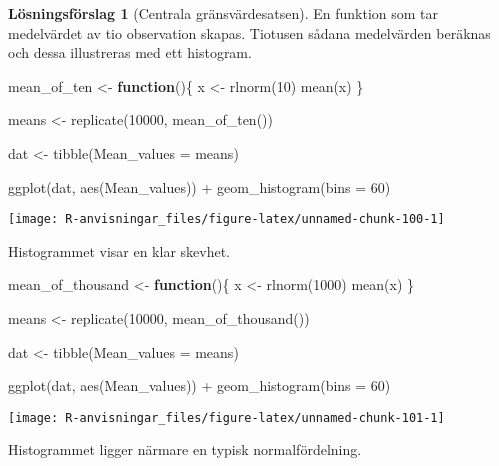 \documentclass[
]{book}
\newenvironment{Shaded}{\begin{snugshade}}{\end{snugshade}}
\newcommand{\AttributeTok}[1]{\textcolor[rgb]{0.77,0.63,0.00}{#1}}
\newcommand{\ControlFlowTok}[1]{\textcolor[rgb]{0.13,0.29,0.53}{\textbf{#1}}}
\newcommand{\DecValTok}[1]{\textcolor[rgb]{0.00,0.00,0.81}{#1}}
\newcommand{\FunctionTok}[1]{\textcolor[rgb]{0.00,0.00,0.00}{#1}}
\newcommand{\NormalTok}[1]{#1}
\newcommand{\OtherTok}[1]{\textcolor[rgb]{0.56,0.35,0.01}{#1}}
\newcommand{\SpecialCharTok}[1]{\textcolor[rgb]{0.00,0.00,0.00}{#1}}
\theoremstyle{definition}
\theoremstyle{definition}
\theoremstyle{definition}
\theoremstyle{definition}
\newtheorem{hypothesis}{Lösningsförslag}[chapter]
\theoremstyle{remark}
\begin{document}
\begin{hypothesis}[Centrala gränsvärdesatsen]
En funktion som tar medelvärdet av tio observation skapas. Tiotusen sådana medelvärden beräknas och dessa illustreras med ett histogram.

\begin{Shaded}
\begin{Highlighting}[]
\NormalTok{mean\_of\_ten }\OtherTok{\textless{}{-}} \ControlFlowTok{function}\NormalTok{()\{}
\NormalTok{  x }\OtherTok{\textless{}{-}} \FunctionTok{rlnorm}\NormalTok{(}\DecValTok{10}\NormalTok{)}
  \FunctionTok{mean}\NormalTok{(x)}
\NormalTok{\}}

\NormalTok{means }\OtherTok{\textless{}{-}} \FunctionTok{replicate}\NormalTok{(}\DecValTok{10000}\NormalTok{, }\FunctionTok{mean\_of\_ten}\NormalTok{())}

\NormalTok{dat }\OtherTok{\textless{}{-}} \FunctionTok{tibble}\NormalTok{(}\AttributeTok{Mean\_values =}\NormalTok{ means)}

\FunctionTok{ggplot}\NormalTok{(dat, }\FunctionTok{aes}\NormalTok{(Mean\_values)) }\SpecialCharTok{+}
  \FunctionTok{geom\_histogram}\NormalTok{(}\AttributeTok{bins =} \DecValTok{60}\NormalTok{)}
\end{Highlighting}
\end{Shaded}

\begin{center}\texttt{[image: R-anvisningar\_files/figure-latex/unnamed-chunk-100-1]} \end{center}

Histogrammet visar en klar skevhet.

\begin{Shaded}
\begin{Highlighting}[]
\NormalTok{mean\_of\_thousand }\OtherTok{\textless{}{-}} \ControlFlowTok{function}\NormalTok{()\{}
\NormalTok{  x }\OtherTok{\textless{}{-}} \FunctionTok{rlnorm}\NormalTok{(}\DecValTok{1000}\NormalTok{)}
  \FunctionTok{mean}\NormalTok{(x)}
\NormalTok{\}}

\NormalTok{means }\OtherTok{\textless{}{-}} \FunctionTok{replicate}\NormalTok{(}\DecValTok{10000}\NormalTok{, }\FunctionTok{mean\_of\_thousand}\NormalTok{())}

\NormalTok{dat }\OtherTok{\textless{}{-}} \FunctionTok{tibble}\NormalTok{(}\AttributeTok{Mean\_values =}\NormalTok{ means)}

\FunctionTok{ggplot}\NormalTok{(dat, }\FunctionTok{aes}\NormalTok{(Mean\_values)) }\SpecialCharTok{+}
  \FunctionTok{geom\_histogram}\NormalTok{(}\AttributeTok{bins =} \DecValTok{60}\NormalTok{)}
\end{Highlighting}
\end{Shaded}

\begin{center}\texttt{[image: R-anvisningar\_files/figure-latex/unnamed-chunk-101-1]} \end{center}

Histogrammet ligger närmare en typisk normalfördelning.
\end{hypothesis}
\end{document}
